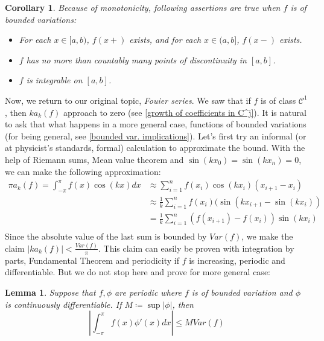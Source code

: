 \documentclass[12pt]{amsart}
\newtheorem{corollary}[theorem]{Corollary}
\newtheorem{lemma}[theorem]{Lemma}
\theoremstyle{definition}
\newcommand{\cC}{{\mathcal C}}
\begin{document}
\begin{corollary}\label{facts on bounded var.}
    Because of monotonicity, following assertions are true when $f$ is of bounded variations:
    \begin{itemize}
        \item[(a)] For each \(x \in [a, b)\), \(f(x+)\) exists, and for each \(x \in (a, b]\), \(f(x-)\) exists.
        \item[(b)] $f$ has no more than countably many points of discontinuity in $[a,b]$.
        \item[(c)] $f$ is integrable on $[a,b]$.
    \end{itemize}
\end{corollary}


Now, we return to our original topic, \emph{Fouier series}. We saw that if $f$ is of class $\cC^1$, then $ka_k(f)$ approach to zero (see \ref{growth of coefficients in C^j}). It is natural to ask that what happens in a more general case, functions of bounded variations (for being general, see \ref{bounded var. implications}). Let's first try an informal (or at physicist's standards, formal) calculation to approximate the bound. With the help of Riemann sums, Mean value theorem and $\sin(kx_0) = \sin(kx_n) = 0$, we can make the following approximation:
\[
\begin{aligned}
    \pi a_k(f) = \int_{-\pi}^{\pi}f(x) \cos(kx) dx &\approx \sum_{i = 1}^{n}f(x_i)\cos(kx_i)(x_{i+1} - x_i)\\
    &\approx \frac{1}{k} \sum_{i = 1}^{n}f(x_i)(\sin(kx_{i+1} - \sin(kx_i))\\
    &= \frac{1}{k} \sum_{i = 1}^{n}(f(x_{i+1}) - f(x_i)) \sin(kx_i)\\
\end{aligned}
\]
Since the absolute value of the last sum is bounded by $Var(f)$, we make the claim $|ka_k(f)| < \frac{Var(f)}{\pi}$. This claim can easily be proven with integration by parts, Fundamental Theorem and periodicity if $f$ is increasing, periodic and differentiable. But we do not stop here and prove for more general case:


\begin{lemma}\label{bounded var. coefficient grow}
    Suppose that $f,\phi$ are periodic where $f$ is of bounded variation and $\phi$ is continuously differentiable. If $M \coloneqq \sup{|\phi|}$, then
    \begin{equation}
        \left|\int_{-\pi}^{\pi}f(x)\phi'(x)dx\right| \leq M Var(f)
    \end{equation}
\end{lemma}
\end{document}
